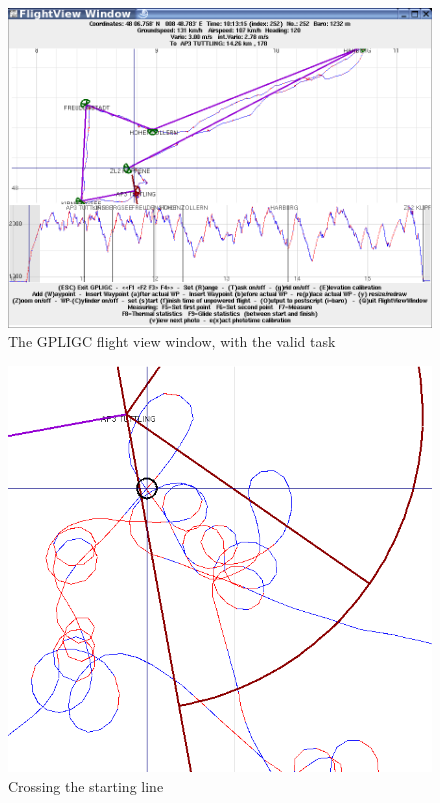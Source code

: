 \begin{figure}[h]
\caption{\label{flightview2}The GPLIGC flight view window, with the valid task}
\begin{center}
\includegraphics[width=\textwidth]{png/flightview-2}
\end{center}
\end{figure}

\begin{figure}[h]
\caption{\label{start}Crossing the starting line}
\begin{center}
\includegraphics[width=\textwidth]{png/start}
\end{center}
\end{figure}

